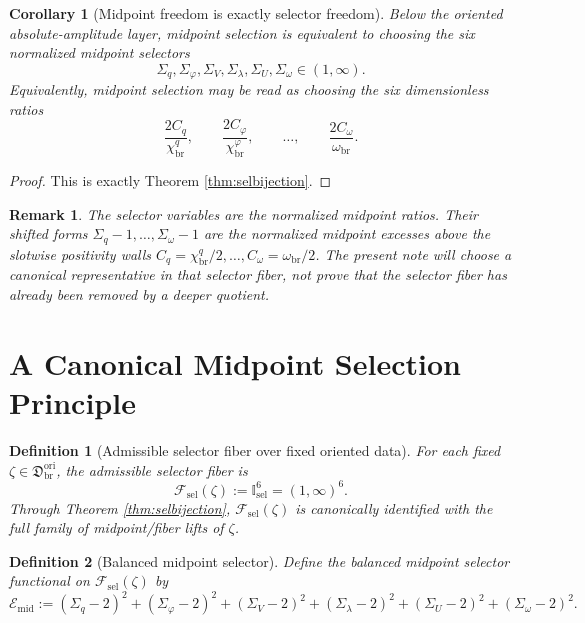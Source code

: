 \documentclass[11pt]{article}
\newcommand{\OriginSector}{\mathfrak D_{\mathrm{br}}^{\mathrm{ori}}}
\newcommand{\AbsReadAmp}{\chi_{\mathrm{br}}^{q}}
\newcommand{\AbsCovAmp}{\chi_{\mathrm{br}}^{\varphi}}
\newcommand{\AbsScaleAmp}{\omega_{\mathrm{br}}}
\newcommand{\MidRead}{C_{q}}
\newcommand{\MidCov}{C_{\varphi}}
\newcommand{\MidScale}{C_{\omega}}
\newcommand{\SelDom}{\mathbb I_{\mathrm{sel}}}
\newcommand{\SelRead}{\Sigma_{q}}
\newcommand{\SelCov}{\Sigma_{\varphi}}
\newcommand{\SelRelax}{\Sigma_{V}}
\newcommand{\SelWell}{\Sigma_{\lambda}}
\newcommand{\SelEq}{\Sigma_{U}}
\newcommand{\SelScale}{\Sigma_{\omega}}
\newcommand{\SelEnergy}{\mathscr E_{\mathrm{mid}}}
\newcommand{\SelFiberClass}{\mathscr F_{\mathrm{sel}}}
\newtheorem{definition}{Definition}
\newtheorem{remark}{Remark}
\newtheorem{corollary}{Corollary}
\begin{document}
\begin{corollary}[Midpoint freedom is exactly selector freedom]
\label{cor:selfreedom}
Below the oriented absolute-amplitude layer, midpoint selection is equivalent to choosing the six normalized midpoint selectors
\[
\SelRead,\SelCov,\SelRelax,\SelWell,\SelEq,\SelScale\in(1,\infty).
\]
Equivalently, midpoint selection may be read as choosing the six dimensionless ratios
\[
\frac{2\MidRead}{\AbsReadAmp},
\qquad
\frac{2\MidCov}{\AbsCovAmp},
\qquad
\ldots,
\qquad
\frac{2\MidScale}{\AbsScaleAmp}.
\]
\end{corollary}

\begin{proof}
This is exactly Theorem \ref{thm:selbijection}.
\end{proof}

\begin{remark}
The selector variables are the normalized midpoint ratios. Their shifted forms \(\SelRead-1,\ldots,\SelScale-1\) are the normalized midpoint excesses above the slotwise positivity walls \(\MidRead=\AbsReadAmp/2,\ldots,\MidScale=\AbsScaleAmp/2\). The present note will choose a canonical representative in that selector fiber, not prove that the selector fiber has already been removed by a deeper quotient.
\end{remark}

\section{A Canonical Midpoint Selection Principle}

\begin{definition}[Admissible selector fiber over fixed oriented data]
\label{def:selfiber}
For each fixed \(\zeta\in\OriginSector\), the admissible selector fiber is
\begin{equation}
\SelFiberClass(\zeta):=\SelDom^{6}=(1,\infty)^{6}.
\label{eq:selfiber}
\end{equation}
Through Theorem \ref{thm:selbijection}, \(\SelFiberClass(\zeta)\) is canonically identified with the full family of midpoint/fiber lifts of \(\zeta\).
\end{definition}

\begin{definition}[Balanced midpoint selector]
\label{def:selenergy}
Define the balanced midpoint selector functional on \(\SelFiberClass(\zeta)\) by
\begin{equation}
\SelEnergy
:=
(\SelRead-2)^{2}
+(\SelCov-2)^{2}
+(\SelRelax-2)^{2}
+(\SelWell-2)^{2}
+(\SelEq-2)^{2}
+(\SelScale-2)^{2}.
\label{eq:selenergy}
\end{equation}
\end{definition}
\end{document}
